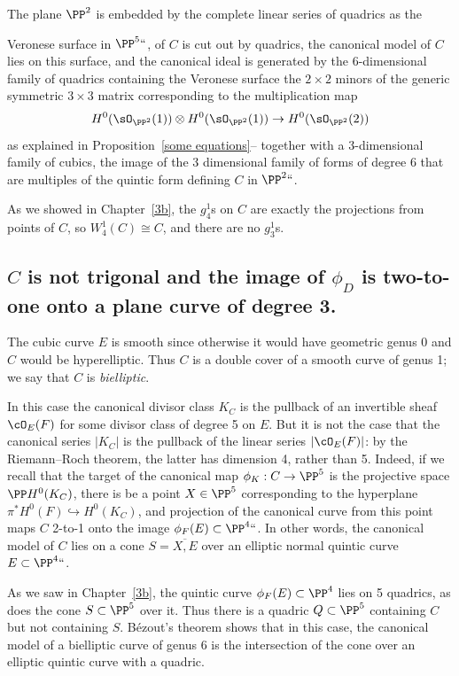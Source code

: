 The plane $\PP^2$ is embedded by the complete linear series of quadrics
as the
{Veronese surface in $\PP^5``$,
%
of $C$ is cut out by quadrics, the canonical model of $C$
lies on this surface, and the canonical ideal is generated by the
6-dimensional family of quadrics containing the Veronese surface\emdash
the $2\times 2$ minors of the generic symmetric $3\times 3$ matrix
corresponding to the multiplication map
$$
H^{0}(\sO_{\PP^{2}}(1)) \otimes H^{0}(\sO_{\PP^{2}}(1)) \to
H^{0}(\sO_{\PP^{2}}(2))
$$
as explained in Proposition~\ref{some equations}-- together with a
3-dimensional family of cubics,  the image of the 3 dimensional family
of forms of degree 6 that are multiples of the quintic form defining $C$
in $\PP^2` `$.

As we showed in Chapter~\ref{3b}, the $g^1_4$s on $C$ are exactly the
projections from points of $C$, so $W^1_4(C)\cong C$, and there are no
$g^{1}_{3}$s.


\subsection*{$C$ is not trigonal and the image of
\texorpdfstring{$\phi_{D}$}{phi(D)} is two-to-one onto a  plane curve
of degree 3.}

The cubic curve $E$ is smooth since otherwise it would have geometric
genus 0 and $C$ would be  hyperelliptic. Thus $C$ is a double cover of
a smooth curve of genus 1; we say that $C$ is \emph{bielliptic}.
%

In this case the canonical divisor class $K_C$ is the pullback of
an invertible sheaf $\cO_E(F)$ for some divisor class of degree 5 on
$E$. But it is not the case that the canonical series $|K_C|$ is the
pullback of the linear series $|\cO_E(F)|$: by the Riemann--Roch theorem,
the latter has dimension 4, rather than 5. Indeed, if we recall that
the target of the canonical map $\phi_K : C \to \PP^5$ is the projective
space $\PP H^0(K_C)$, there is be a point $X \in \PP^5$ corresponding to
the hyperplane $\pi^*H^0(F) \hookrightarrow H^0(K_C)$, and projection
of the canonical curve from this point maps $C$ 2-to-1 onto the image
$\phi_F(E) \subset \PP^4` `$. In other words, the canonical model of $C$
lies on a cone $S = \overline{X, E}$ over an elliptic normal quintic
curve $E \subset \PP^4` `$.

As we saw in Chapter~\ref{3b}, the quintic curve $\phi_F(E) \subset \PP^4$
lies on 5 quadrics, as does the cone $S \subset \PP^5$ over it. Thus
there is a quadric $Q \subset \PP^5$ containing $C$ but not containing
$S$. B\'ezout's theorem shows that in this case, the canonical model of
a bielliptic curve of genus 6 is the intersection of the cone over an
elliptic quintic curve with a quadric.

}
